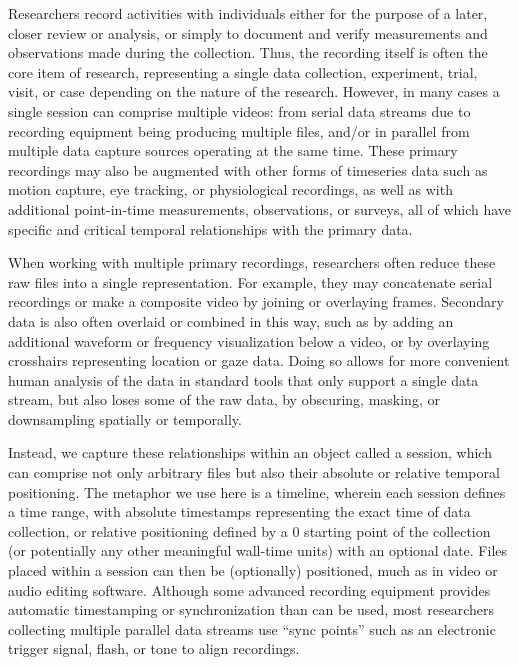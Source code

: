 \documentclass{sig-alternate}
\begin{document}
Researchers record activities with individuals either for the purpose of a later, closer review or analysis, or simply to document and verify measurements and observations made during the collection.
Thus, the recording itself is often the core item of research, representing a single data collection, experiment, trial, visit, or case depending on the nature of the research.
However, in many cases a single session can comprise multiple videos: from serial data streams due to recording equipment being producing multiple files, and/or in parallel from multiple data capture sources operating at the same time.
These primary recordings may also be augmented with other forms of timeseries data such as motion capture, eye tracking, or physiological recordings, as well as with additional point-in-time measurements, observations, or surveys, all of which have specific and critical temporal relationships with the primary data.

When working with multiple primary recordings, researchers often reduce these raw files into a single representation.
For example, they may concatenate serial recordings or make a composite video by joining or overlaying frames.
Secondary data is also often overlaid or combined in this way, such as by adding an additional waveform or frequency visualization below a video, or by overlaying crosshairs representing location or gaze data.
Doing so allows for more convenient human analysis of the data in standard tools that only support a single data stream, but also loses some of the raw data, by obscuring, masking, or downsampling spatially or temporally.

Instead, we capture these relationships within an object called a session, which can comprise not only arbitrary files but also their absolute or relative temporal positioning.
The metaphor we use here is a timeline, wherein each session defines a time range, with absolute timestamps representing the exact time of data collection, or relative positioning defined by a 0 starting point of the collection (or potentially any other meaningful wall-time units) with an optional date.
Files placed within a session can then be (optionally) positioned, much as in video or audio editing software.
Although some advanced recording equipment provides automatic timestamping or synchronization than can be used, most researchers collecting multiple parallel data streams use ``sync points'' such as an electronic trigger signal, flash, or tone to align recordings.
\end{document}
